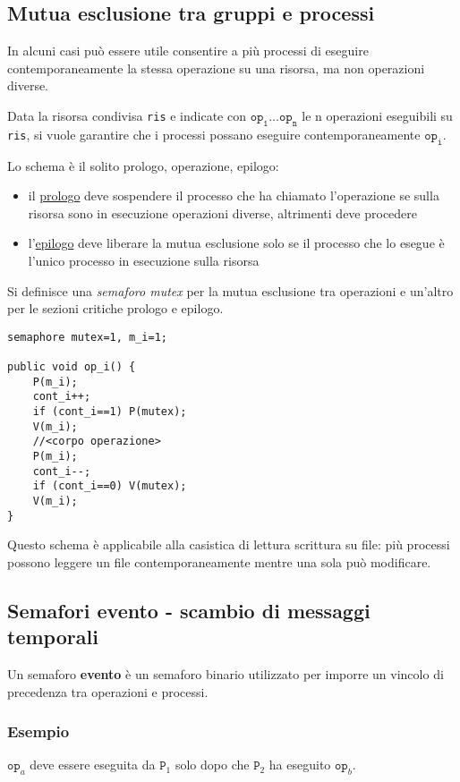 \subsection{Mutua esclusione tra gruppi e processi}
In alcuni casi può essere utile consentire a più processi di eseguire contemporaneamente la stessa operazione su una risorsa, ma non operazioni diverse.

Data la risorsa condivisa \texttt{ris} e indicate con $\texttt{op}_\texttt{1} \dots \texttt{op}_\texttt{n}$ le n operazioni eseguibili su \texttt{ris}, si vuole garantire che i processi possano eseguire contemporaneamente $\texttt{op}_\texttt{i}$.

Lo schema è il solito prologo, operazione, epilogo:
\begin{itemize}
    \item il \underline{prologo} deve sospendere il processo che ha chiamato l'operazione se sulla risorsa sono in esecuzione operazioni diverse, altrimenti deve procedere
    \item l'\underline{epilogo} deve liberare la mutua esclusione solo se il processo che lo esegue è l'unico processo in esecuzione sulla risorsa
\end{itemize}

Si definisce una \textit{semaforo mutex} per la mutua esclusione tra operazioni e un'altro per le sezioni critiche prologo e epilogo.

\begin{verbatim}
semaphore mutex=1, m_i=1;

public void op_i() {
    P(m_i);
    cont_i++;
    if (cont_i==1) P(mutex);
    V(m_i);
    //<corpo operazione>
    P(m_i);
    cont_i--;
    if (cont_i==0) V(mutex);
    V(m_i);
}
\end{verbatim}

Questo schema è applicabile alla casistica di lettura scrittura su file: più processi possono leggere un file contemporaneamente mentre una sola può modificare.

\subsection{Semafori evento - scambio di messaggi temporali}
Un semaforo \textbf{evento} è un semaforo binario utilizzato per imporre un vincolo di precedenza tra operazioni e processi.

\subsubsection{Esempio}
$\texttt{op}_a$ deve essere eseguita da $\texttt{P}_1$ solo dopo che $\texttt{P}_2$ ha eseguito $\texttt{op}_b$.

